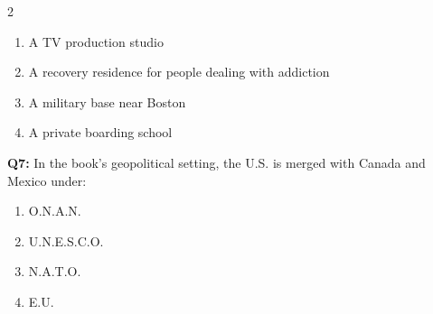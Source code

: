 \documentclass[10pt]{article}
\begin{document}
\begin{multicols}{2}
\begin{enumerate}[label=\arabic*.]
\item A TV production studio
\item A recovery residence for people dealing with addiction
\item A military base near Boston
\item A private boarding school
\end{enumerate}
\textbf{Q7:} In the book's geopolitical setting, the U.S. is merged with Canada and Mexico under:

\begin{enumerate}[label=\arabic*.]
\item O.N.A.N.
\item U.N.E.S.C.O.
\item N.A.T.O.
\item E.U.
\end{enumerate}
\end{multicols}

\newpage
\end{document}
